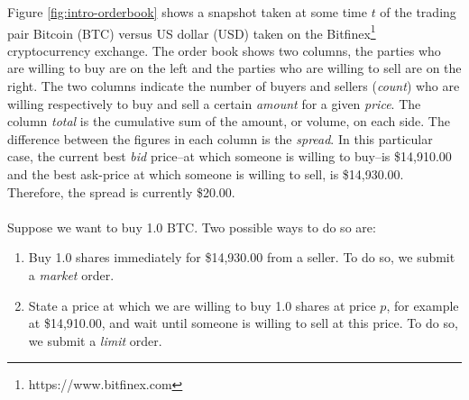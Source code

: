 Figure \ref{fig:intro-orderbook} shows a snapshot taken at some time $t$ of the trading pair Bitcoin (BTC) versus US dollar (USD) taken on the Bitfinex\footnote{https://www.bitfinex.com} cryptocurrency exchange.
The order book shows two columns, the parties who are willing to buy are on the left and the parties who are willing to sell are on the right.
The two columns indicate the number of buyers and sellers (\textit{count}) who are willing respectively to buy and sell a certain \textit{amount} for a given \textit{price}.
The column \textit{total} is the cumulative sum of the amount, or volume, on each side.
The difference between the figures in each column is the \textit{spread}.
In this particular case, the current best \textit{bid} price--at which someone is willing to buy--is \$14,910.00 and the best ask-price at which someone is willing to sell, is \$14,930.00.
Therefore, the spread is currently \$20.00.
\\
\\
Suppose we want to buy 1.0 BTC.
Two possible ways to do so are:
\begin{enumerate}
    \item Buy 1.0 shares immediately for \$14,930.00 from a seller. To do so, we submit a \textit{market} order.
    \item State a price at which we are willing to buy 1.0 shares at price $p$, for example at \$14,910.00, and wait until someone is willing to sell at this price. To do so, we submit a \textit{limit} order.
\end{enumerate}

